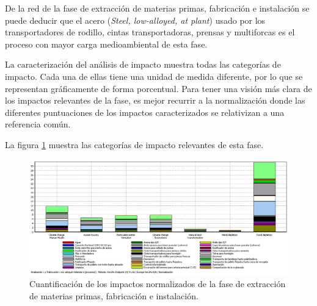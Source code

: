 De la red de la fase de extracción de materias primas, fabricación e instalación se puede deducir que el acero (\textit{Steel, low-alloyed, at plant}) usado por los transportadores de rodillo, cintas transportadoras, prensas y multiforcas es el proceso con mayor carga medioambiental de esta fase.

La caracterización del análisis de impacto muestra todas las categorías de impacto. Cada una de ellas tiene una unidad de medida diferente, por lo que se representan gráficamente de forma porcentual. Para tener una visión más clara de los impactos relevantes de la fase, es mejor recurrir a la normalización donde las diferentes puntuaciones de los impactos caracterizados se relativizan a una referencia común.

La figura \ref{fig:fabric_normalizacion} muestra las categorías de impacto relevantes de esta fase.

\begin{figure}[!htb]
\centering
\includegraphics[width=15cm]{img/fabric_normalizacion.png}
\caption{Cuantificación de los impactos normalizados de la fase de extracción de materias primas, fabricación e instalación.}
\label{fig:fabric_normalizacion}
\end{figure}


